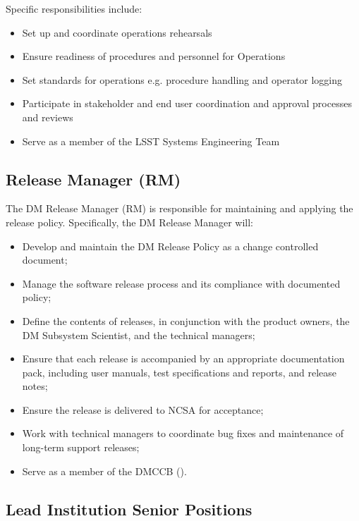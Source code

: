 Specific responsibilities include:

\begin{itemize}
\item Set up and coordinate operations rehearsals
\item Ensure readiness of procedures and personnel for Operations
\item Set standards for operations e.g. procedure handling and operator logging
\item Participate in stakeholder and end user coordination and approval processes and reviews
\item Serve as a member of the LSST Systems Engineering Team
\end{itemize}

\subsection{Release Manager (RM)}\label{role:dmrm}

The DM Release Manager (RM) is responsible for maintaining and applying the release policy.
Specifically, the DM Release Manager will:

\begin{itemize}

  \item{Develop and maintain the DM Release Policy as a change controlled
  document;}
  \item{Manage the software release process and its compliance with documented
  policy;}
  \item{Define the contents of releases, in conjunction with the product
  owners, the DM Subsystem Scientist, and the technical managers;}
  \item{Ensure that each release is accompanied by an appropriate
  documentation pack, including user manuals, test specifications and reports,
  and release notes;}
  \item{Ensure the release is delivered to NCSA for acceptance;}
  \item{Work with technical managers to coordinate bug fixes and maintenance
  of long-term support releases;}
  \item{Serve as a member of the DMCCB ().}

\end{itemize}

\subsection{Lead Institution Senior Positions}

